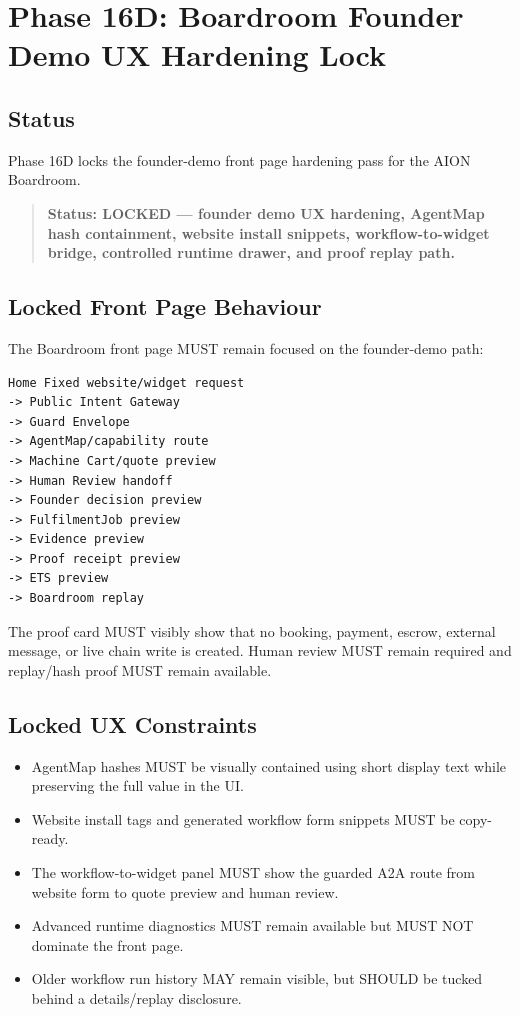 \section{Phase 16D: Boardroom Founder Demo UX Hardening Lock}
\label{sec:phase16d-founder-demo-ux-hardening-lock}

\subsection{Status}

Phase 16D locks the founder-demo front page hardening pass for the AION Boardroom.

\begin{quote}
\textbf{Status: LOCKED --- founder demo UX hardening, AgentMap hash containment, website install snippets, workflow-to-widget bridge, controlled runtime drawer, and proof replay path.}
\end{quote}

\subsection{Locked Front Page Behaviour}

The Boardroom front page MUST remain focused on the founder-demo path:

\begin{verbatim}
Home Fixed website/widget request
-> Public Intent Gateway
-> Guard Envelope
-> AgentMap/capability route
-> Machine Cart/quote preview
-> Human Review handoff
-> Founder decision preview
-> FulfilmentJob preview
-> Evidence preview
-> Proof receipt preview
-> ETS preview
-> Boardroom replay
\end{verbatim}

The proof card MUST visibly show that no booking, payment, escrow, external message, or live chain write is created. Human review MUST remain required and replay/hash proof MUST remain available.

\subsection{Locked UX Constraints}

\begin{itemize}
  \item AgentMap hashes MUST be visually contained using short display text while preserving the full value in the UI.
  \item Website install tags and generated workflow form snippets MUST be copy-ready.
  \item The workflow-to-widget panel MUST show the guarded A2A route from website form to quote preview and human review.
  \item Advanced runtime diagnostics MUST remain available but MUST NOT dominate the front page.
  \item Older workflow run history MAY remain visible, but SHOULD be tucked behind a details/replay disclosure.
\end{itemize}

